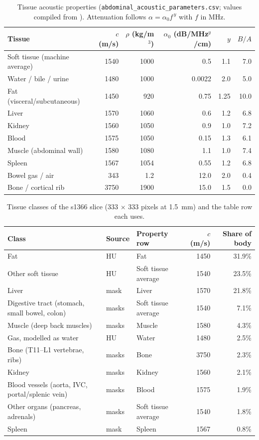 \documentclass[11pt]{article}
\newcommand{\code}[1]{\texttt{#1}}
\begin{document}
\begin{table}[ht]
\centering
\small
\caption{Tissue acoustic properties (\code{abdominal\_acoustic\_parameters.csv};
  values compiled from \cite{duck1990, szabo, mast2000}). Attenuation follows
  $\alpha = \alpha_0 f^{\,y}$ with $f$ in MHz.}
\label{tab:acoustic}
\begin{tabular}{@{}lrrrrr@{}}
\toprule
Tissue & $c$ (m/s) & $\rho$ (kg/m$^3$) & $\alpha_0$ (dB/MHz$^y$/cm) & $y$ & $B/A$ \\
\midrule
Soft tissue (machine average) & 1540 & 1000 & 0.5 & 1.1 & 7.0 \\
Water / bile / urine & 1480 & 1000 & 0.0022 & 2.0 & 5.0 \\
Fat (visceral/subcutaneous) & 1450 & 920 & 0.75 & 1.25 & 10.0 \\
Liver & 1570 & 1060 & 0.6 & 1.2 & 6.8 \\
Kidney & 1560 & 1050 & 0.9 & 1.0 & 7.2 \\
Blood & 1575 & 1050 & 0.15 & 1.3 & 6.1 \\
Muscle (abdominal wall) & 1580 & 1080 & 1.1 & 1.0 & 7.4 \\
Spleen & 1567 & 1054 & 0.55 & 1.2 & 6.8 \\
Bowel gas / air & 343 & 1.2 & 12.0 & 2.0 & 0.4 \\
Bone / cortical rib & 3750 & 1900 & 15.0 & 1.5 & 0.0 \\
\bottomrule
\end{tabular}
\end{table}

\begin{table}[ht]
\centering
\small
\caption{Tissue classes of the s1366 slice (333 $\times$ 333 pixels at 1.5~mm)
  and the table row each uses.}
\label{tab:tissues}
\begin{tabular}{@{}lllrr@{}}
\toprule
Class & Source & Property row & $c$ (m/s) & Share of body \\
\midrule
Fat & HU & Fat & 1450 & 31.9\% \\
Other soft tissue & HU & Soft tissue average & 1540 & 23.5\% \\
Liver & mask & Liver & 1570 & 21.8\% \\
Digestive tract (stomach, small bowel, colon) & masks & Soft tissue average & 1540 & 7.1\% \\
Muscle (deep back muscles) & masks & Muscle & 1580 & 4.3\% \\
Gas, modelled as water & HU & Water & 1480 & 2.5\% \\
Bone (T11--L1 vertebrae, ribs) & masks & Bone & 3750 & 2.3\% \\
Kidney & masks & Kidney & 1560 & 2.1\% \\
Blood vessels (aorta, IVC, portal/splenic vein) & masks & Blood & 1575 & 1.9\% \\
Other organs (pancreas, adrenals) & masks & Soft tissue average & 1540 & 1.8\% \\
Spleen & mask & Spleen & 1567 & 0.8\% \\
\bottomrule
\end{tabular}
\end{table}
\end{document}
